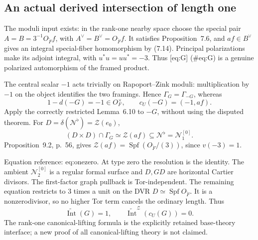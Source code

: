 \documentclass[10pt]{article}
\begin{document}
\subsection*{An actual derived intersection of length one}
The moduli input exists: in the rank-one nearby space choose the special pair \(A=B=3^{-1}O_{\breve F}f\), with \(A^\vee=B^\vee=O_{\breve F}f\). It satisfies Proposition 7.6, and \(af\in B^\vee\) gives an integral special-fiber homomorphism by (7.14). Principal polarizations make its adjoint integral, with \(u^*u=uu^*=-3\). Thus [eq:G] (\#eq:G) is a genuine polarized automorphism of the framed product.\par
The central scalar \(-1\) acts trivially on Rapoport–Zink moduli: multiplication by \(-1\) on the object identifies the two framings. Hence \(\Gamma_G=\Gamma_{-G}\), whereas \[1-d(-G)=-1\in O_F^\times,\qquad c_U(-G)=(-1,af).\] Apply the correctly restricted Lemma 6.10 to \(-G\), without using the disputed theorem. For \(D=\delta(\mathcal N^\flat)=\mathcal Z(e_0)\), \[(D\times D)\cap\Gamma_G
 \simeq\mathcal Z(af)\subseteq\mathcal N^\flat=\mathcal N_1^{[0]}.\] Proposition 9.2, p. 56, gives \(\mathcal Z(af)=\operatorname{Spf}(O_{\breve F}/(3))\), since \(v(-3)=1\).\par
Equation reference: eq:onezero. At type zero the resolution is the identity. The ambient \(\mathcal N_2^{[0]}\) is a regular formal surface and \(D,GD\) are horizontal Cartier divisors. The first-factor graph pullback is Tor-independent. The remaining equation restricts to \(3\) times a unit on the DVR \(D\simeq\operatorname{Spf}O_{\breve F}\). It is a nonzerodivisor, so no higher Tor term cancels the ordinary length. Thus \[
 \widetilde{\operatorname{Int}}(G)=1,\qquad \widetilde{\operatorname{Int}}^{\mathcal Z}(c_U(G))=0.\] The rank-one canonical-lifting formula is the explicitly retained base-theory interface; a new proof of all canonical-lifting theory is not claimed.\par
\end{document}
